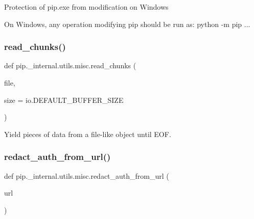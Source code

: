 \begin{DoxyVerb}Protection of pip.exe from modification on Windows

On Windows, any operation modifying pip should be run as:
    python -m pip ...
\end{DoxyVerb}
 \mbox{\label{namespacepip_1_1__internal_1_1utils_1_1misc_a25da090ad5c5713ddf62d788dac9e051}} 
\subsubsection{\texorpdfstring{read\+\_\+chunks()}{read\_chunks()}}
{\footnotesize\ttfamily def pip.\+\_\+internal.\+utils.\+misc.\+read\+\_\+chunks (\begin{DoxyParamCaption}\item[{}]{file,  }\item[{}]{size = {\ttfamily io.DEFAULT\+\_\+BUFFER\+\_\+SIZE} }\end{DoxyParamCaption})}

\begin{DoxyVerb}Yield pieces of data from a file-like object until EOF.\end{DoxyVerb}
 \mbox{\label{namespacepip_1_1__internal_1_1utils_1_1misc_a751f3cb047166ae80782e0d1d7c6c7c7}} 
\subsubsection{\texorpdfstring{redact\+\_\+auth\+\_\+from\+\_\+url()}{redact\_auth\_from\_url()}}
{\footnotesize\ttfamily def pip.\+\_\+internal.\+utils.\+misc.\+redact\+\_\+auth\+\_\+from\+\_\+url (\begin{DoxyParamCaption}\item[{}]{url }\end{DoxyParamCaption})}

